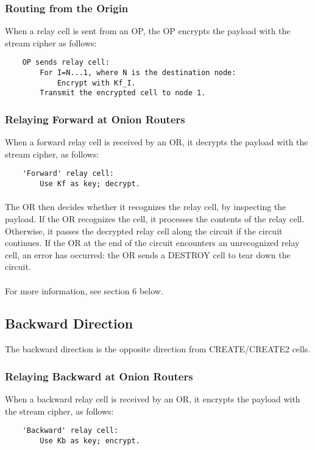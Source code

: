 \subsubsection{Routing from the Origin}
When a relay cell is sent from an OP, the OP encrypts the payload
with the stream cipher as follows:

\begin{verbatim}
    OP sends relay cell:
        For I=N...1, where N is the destination node:
            Encrypt with Kf_I.
        Transmit the encrypted cell to node 1.
\end{verbatim}


\subsubsection{Relaying Forward at Onion Routers}
When a forward relay cell is received by an OR, it decrypts the payload
with the stream cipher, as follows:
\begin{verbatim}
    'Forward' relay cell:
        Use Kf as key; decrypt.
\end{verbatim}

\paragraph{}
The OR then decides whether it recognizes the relay cell, by
inspecting the payload. If the OR
recognizes the cell, it processes the contents of the relay cell.
Otherwise, it passes the decrypted relay cell along the circuit if
the circuit continues. If the OR at the end of the circuit
encounters an unrecognized relay cell, an error has occurred: the OR
sends a DESTROY cell to tear down the circuit.

\paragraph{}
For more information, see section 6 below.

\subsection{Backward Direction}
The backward direction is the opposite direction from
CREATE/CREATE2 cells.

\subsubsection{Relaying Backward at Onion Routers}
When a backward relay cell is received by an OR, it encrypts the payload
with the stream cipher, as follows:
\begin{verbatim}
    'Backward' relay cell:
        Use Kb as key; encrypt.
\end{verbatim}

